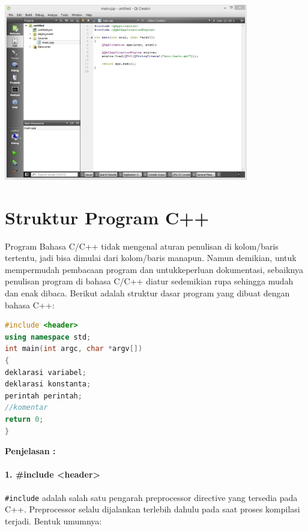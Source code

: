 \begin{center}

\includegraphics[width=0.8\textwidth]{images/qt-creator.jpg}

\end{center}

\section{Struktur Program C++}\label{struktur-program-cpp}

Program Bahasa C/C++ tidak mengenal aturan penulisan di kolom/baris
tertentu, jadi bisa dimulai dari kolom/baris manapun. Namun demikian,
untuk mempermudah pembacaan program dan untukkeperluan dokumentasi,
sebaiknya penulisan program di bahasa C/C++ diatur sedemikian rupa
sehingga mudah dan enak dibaca. Berikut adalah struktur dasar program
yang dibuat dengan bahasa C++:

\begin{lstlisting}[language=c++, caption=Struktur Program C++]
#include <header>  
using namespace std;    
int main(int argc, char *argv[])
{  
deklarasi variabel;   
deklarasi konstanta;  
perintah perintah;  
//komentar  
return 0;  
}  
\end{lstlisting}

\textbf{Penjelasan :}

\paragraph{ 1. \#include <header>}

\texttt{\#include} adalah salah satu pengarah preprocessor directive
yang tersedia pada C++. Preprocessor selalu dijalankan terlebih dahulu
pada saat proses kompilasi terjadi. Bentuk umumnya:

